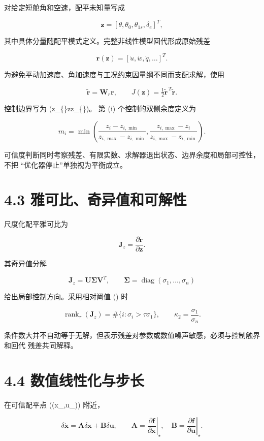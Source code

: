 \documentclass[UTF8,11pt,oneside,openany,fontset=windows]{ctexbook}
\begin{document}
对给定短舱角和空速，配平未知量写成

\[
\mathbf z=[\theta,\theta_0,\theta_{1s},\delta_e]^T,
\]

其中具体分量随配平模式定义。完整非线性模型回代形成原始残差

\[
\mathbf r(\mathbf z)=[\dot u,\dot w,\dot q,\ldots]^T .
\]

为避免平动加速度、角加速度与工况约束因量纲不同而支配求解，使用

\[
\widetilde{\mathbf r}=\mathbf W_r\mathbf r,\qquad
J(\mathbf z)=\tfrac12\widetilde{\mathbf r}^{\,T}\widetilde{\mathbf r}.
\]

控制边界写为 (\mathbf z\_\{\min\}\le\mathbf z\le\mathbf z\_\{\max\})。
第 (i) 个控制的双侧余度定义为

\[
m_i=\min\left(\frac{z_i-z_{i,\min}}{z_{i,\max}-z_{i,\min}},
\frac{z_{i,\max}-z_i}{z_{i,\max}-z_{i,\min}}\right).
\]

可信度判断同时考察残差、有限实数、求解器退出状态、边界余度和局部可控性，不把
``优化器停止''单独视为平衡成立。

\section{4.3
雅可比、奇异值和可解性}\label{ux96c5ux53efux6bd4ux5947ux5f02ux503cux548cux53efux89e3ux6027}

尺度化配平雅可比为

\[
\mathbf J_z=\frac{\partial\widetilde{\mathbf r}}{\partial\mathbf z}.
\]

其奇异值分解

\[
\mathbf J_z=\mathbf U\boldsymbol\Sigma\mathbf V^T,\qquad
\boldsymbol\Sigma=\operatorname{diag}(\sigma_1,\ldots,\sigma_n)
\]

给出局部控制方向。采用相对阈值 (\tau) 时

\[
\operatorname{rank}_\tau(\mathbf J_z)=
\#\{i:\sigma_i>\tau\sigma_1\},\qquad
\kappa_2=\frac{\sigma_1}{\sigma_n}.
\]

条件数大并不自动等于无解，但表示残差对参数或数值噪声敏感，必须与控制触界和回代
残差共同解释。

\section{4.4
数值线性化与步长}\label{ux6570ux503cux7ebfux6027ux5316ux4e0eux6b65ux957f}

在可信配平点 ((\mathbf x\_\star,\mathbf u\_\star)) 附近，

\[
\delta\dot{\mathbf x}=\mathbf A\delta\mathbf x+\mathbf B\delta\mathbf u,
\qquad
\mathbf A=\left.\frac{\partial\mathbf f}{\partial\mathbf x}\right|_\star,\quad
\mathbf B=\left.\frac{\partial\mathbf f}{\partial\mathbf u}\right|_\star .
\]
\end{document}
